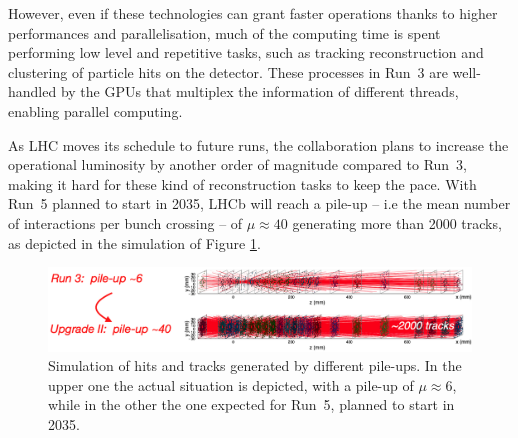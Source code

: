 


However, even if these technologies can grant faster operations thanks to higher performances and parallelisation, much of the computing time is spent performing low level and repetitive tasks, such as tracking reconstruction and clustering of particle hits on the detector. These processes in Run~3 are well-handled by the GPUs that multiplex the information of different threads, enabling parallel computing.

As LHC moves its schedule to future runs, the collaboration plans to increase the operational luminosity by another order of magnitude compared to Run~3, making it hard for these kind of reconstruction tasks to keep the pace. With Run~5 planned to start in 2035, LHCb will reach a pile-up -- i.e the mean number of interactions per bunch crossing -- of $\mu\approx 40$ generating more than 2000 tracks, as depicted in the simulation of Figure \ref{fig:velo_pile-up}. 

\begin{figure}
    \centering
    \includegraphics[width=\textwidth]{figures/VELO_pile-up.png}
    \caption{Simulation of hits and tracks generated by different pile-ups. In the upper one the actual situation is depicted, with a pile-up of $\mu\approx 6$, while in the other the one expected for Run~5, planned to start in 2035.}
    \label{fig:velo_pile-up}
\end{figure}

